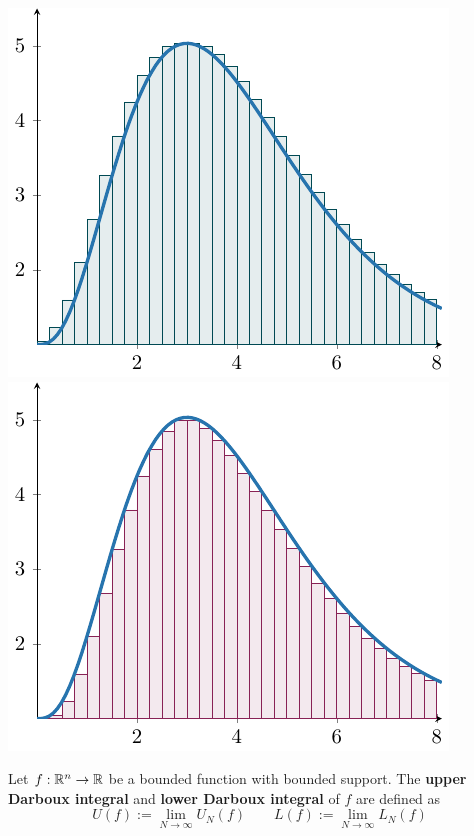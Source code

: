     \begin{center}
        \includegraphics{chapters/4-IntegrationRn/figures/figures-upper2.pdf}
        \includegraphics{chapters/4-IntegrationRn/figures/figures-lower2.pdf}
    \end{center}
    
    
    \begin{definition}
    Let $f: \mathbb{R}^n \to \mathbb{R}$ be a bounded function with bounded support.  The \textbf{upper Darboux integral} and \textbf{lower Darboux integral} of $f$ are defined as
    $$U(f) := \lim_{N \to \infty} U_N(f)   \qquad L(f) := \lim_{N \to \infty} L_N(f)$$
    \end{definition}

    \begin{remark}
    \end{remark}

